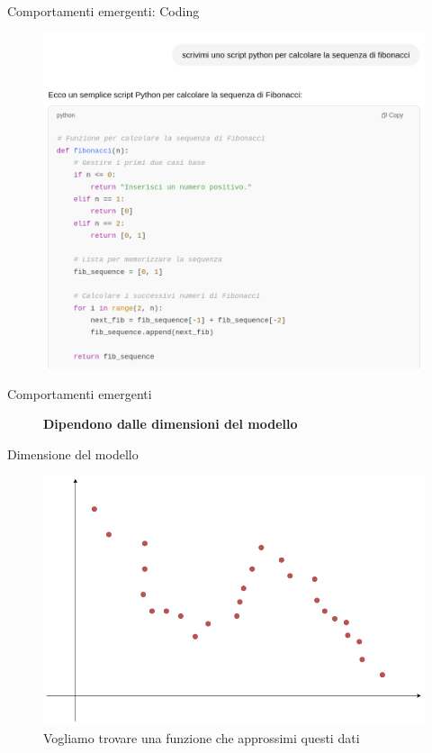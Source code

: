 \documentclass{beamer}
\begin{document}
\begin{frame}{Comportamenti emergenti: Coding}
    \begin{figure}
        \centering
        \includegraphics[width=.8\linewidth]{imgs/emergent/gpt_fibonacci2.png}
    \end{figure}
\end{frame}

\begin{frame}{Comportamenti emergenti}
    \begin{figure}
        \centering
        \caption*{\textbf{Dipendono dalle dimensioni del modello}}
    \end{figure}
\end{frame}

\begin{frame}{Dimensione del modello}
    \begin{figure}
        \centering
        \includegraphics[width=.7\linewidth]{imgs/emergent/chartnninitial.png}
        \caption*{Vogliamo trovare una funzione che approssimi questi dati}
    \end{figure}
\end{frame}
\end{document}
